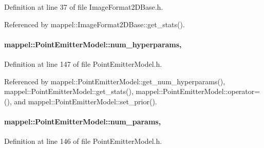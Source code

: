 Definition at line 37 of file Image\+Format2\+D\+Base.\+h.



Referenced by mappel\+::\+Image\+Format2\+D\+Base\+::get\+\_\+stats().

\paragraph[{\texorpdfstring{num\+\_\+hyperparams}{num_hyperparams}}]{ mappel\+::\+Point\+Emitter\+Model\+::num\+\_\+hyperparams\hspace{0.3cm}{\ttfamily [protected]}, {\ttfamily [inherited]}}\hypertarget{classmappel_1_1PointEmitterModel_ab2423214fdd81c8212118770b5b17b1f}{}\label{classmappel_1_1PointEmitterModel_ab2423214fdd81c8212118770b5b17b1f}


Definition at line 147 of file Point\+Emitter\+Model.\+h.



Referenced by mappel\+::\+Point\+Emitter\+Model\+::get\+\_\+num\+\_\+hyperparams(), mappel\+::\+Point\+Emitter\+Model\+::get\+\_\+stats(), mappel\+::\+Point\+Emitter\+Model\+::operator=(), and mappel\+::\+Point\+Emitter\+Model\+::set\+\_\+prior().

\paragraph[{\texorpdfstring{num\+\_\+params}{num_params}}]{ mappel\+::\+Point\+Emitter\+Model\+::num\+\_\+params\hspace{0.3cm}{\ttfamily [protected]}, {\ttfamily [inherited]}}\hypertarget{classmappel_1_1PointEmitterModel_a9af0484391bd6021ddc04ac666ab49ad}{}\label{classmappel_1_1PointEmitterModel_a9af0484391bd6021ddc04ac666ab49ad}


Definition at line 146 of file Point\+Emitter\+Model.\+h.



